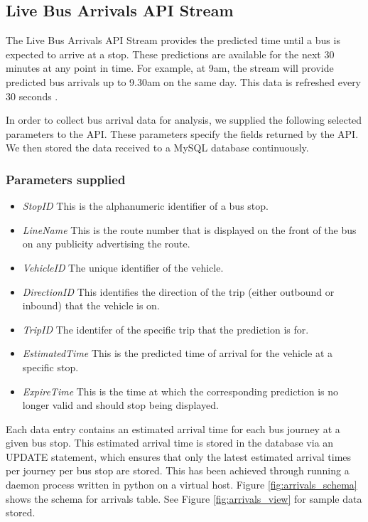 
\subsection{Live Bus Arrivals API Stream}
\par The Live Bus Arrivals API Stream provides the predicted time until a bus is expected to arrive at a stop. These predictions are available for the next 30 minutes at any point in time. For example, at 9am, the stream will provide predicted bus arrivals up to 9.30am on the same day. This data is refreshed every 30 seconds \cite{live_bus_api_documentation}.

\par In order to collect bus arrival data for analysis, we supplied the following selected parameters to the API. These parameters specify the fields returned by the API. We then stored the data received to a MySQL database continuously.

\subsubsection{Parameters supplied}
\begin{itemize}
	\item \textit{StopID} This is the alphanumeric identifier of a bus stop.
  \item \textit{LineName} This is the route number that is displayed on the front of the bus on any publicity advertising the route.
	\item \textit{VehicleID} The unique identifier of the vehicle.
  \item \textit{DirectionID} This identifies the direction of the trip (either outbound or inbound) that the vehicle is on.
  \item \textit{TripID} The identifer of the specific trip that the prediction is for.
  \item \textit{EstimatedTime} This is the predicted time of arrival for the vehicle at a specific stop.
  \item \textit{ExpireTime} This is the time at which the corresponding prediction is no longer valid and should stop being displayed.
\end{itemize}

\par Each data entry contains an estimated arrival time for each bus journey at a given bus stop. This estimated arrival time is stored in the database via an UPDATE statement, which ensures that only the latest estimated arrival times per journey per bus stop are stored. This has been achieved through running a daemon process written in python on a virtual host. Figure \ref{fig:arrivals_schema} shows the schema for arrivals table. See Figure \ref{fig:arrivals_view} for sample data stored.

